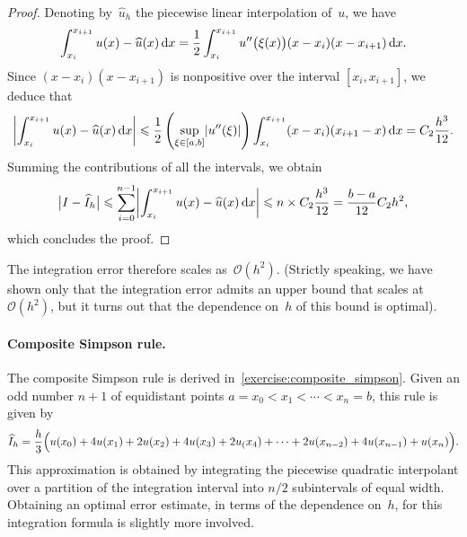 \begin{proof}
Denoting by~$\widehat u_h$ the piecewise linear interpolation of~$u$,
we have
\[
    \int_{x_{i}}^{x_{i+1}} u(x) - \widehat u(x) \, \mathrm d x
    = \frac{1}{2} \int_{x_{i}}^{x_{i+1}} u''\bigl(\xi(x)\bigr) (x - x_{i}) (x - x_{i+1}) \, \mathrm d x.
\]
Since $(x - x_i) (x - x_{i+1})$ is nonpositive over the interval $[x_i, x_{i+1}]$,
we deduce that
\[
    \abs*{\int_{x_{i}}^{x_{i+1}} u(x) - \widehat u(x) \, \d x}
    \leq \frac{1}{2} \left( \sup_{\xi \in [a, b]} \abs*{u''(\xi)} \right) \int_{x_{i}}^{x_{i+1}} (x - x_{i}) (x_{i+1} - x) \, \d x
    = C_2 \frac{h^3}{12}.
\]
Summing the contributions of all the intervals,
we obtain
\[
    \bigl\lvert I - \widehat I_h \bigr\rvert
    \leq \sum_{i=0}^{n-1} \abs*{\int_{x_i}^{x_{i+1}} u(x) - \widehat u(x) \, \d x }
    \leq n \times C_2 \frac{h^3}{12} = \frac{b-a}{12} C_2 h^2,
\]
which concludes the proof.
\end{proof}

The integration error therefore scales as~$\mathcal O(h^2)$.
(Strictly speaking, we have shown only that the integration error admits an upper bound that scales at $\mathcal O(h^2)$,
but it turns out that the dependence on~$h$ of this bound is optimal).

\paragraph{Composite Simpson rule.}
The composite Simpson rule is derived in~\cref{exercise:composite_simpson}.
Given an odd number $n+1$ of equidistant points $a = x_0 < x_1 < \dotsb < x_n = b$,
this rule is given by
\begin{equation}
    \label{eq:composite_simpson}
    \widehat I_h = \frac{h}{3} \Bigl( u(x_0) + 4 u(x_1) + 2 u(x_2) + 4 u(x_3) + 2 u_(x_4) + \dotsb + 2 u(x_{n-2}) + 4 u(x_{n-1}) + u(x_n)\Bigr).
\end{equation}
This approximation is obtained by integrating the piecewise quadratic interpolant
over a partition of the integration interval into $n/2$ subintervals of equal width.
Obtaining an optimal error estimate,
in terms of the dependence on~$h$,
for this integration formula is slightly more involved.

